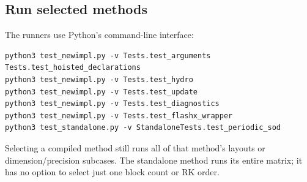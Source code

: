 \documentclass[11pt]{article}
\newcommand{\file}[1]{\texttt{\detokenize{#1}}}
\begin{document}
\subsection{Run selected methods}
The runners use Python's \file{unittest} command-line interface:
\begin{lstlisting}
python3 test_newimpl.py -v Tests.test_arguments Tests.test_hoisted_declarations
python3 test_newimpl.py -v Tests.test_hydro
python3 test_newimpl.py -v Tests.test_update
python3 test_newimpl.py -v Tests.test_diagnostics
python3 test_newimpl.py -v Tests.test_flashx_wrapper
python3 test_standalone.py -v StandaloneTests.test_periodic_sod
\end{lstlisting}
Selecting a compiled method still runs all of that method's layouts or dimension/precision subcases. The standalone method runs its entire matrix; it has no option to select just one block count or RK order.
\end{document}
